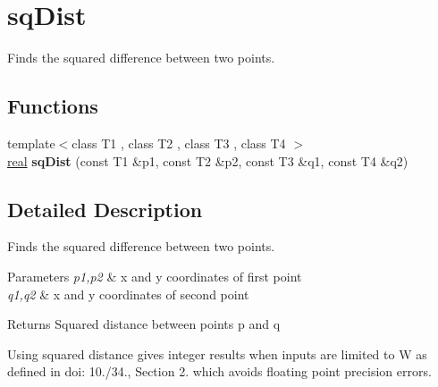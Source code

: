 \hypertarget{group__sqDist}{}\section{sq\+Dist}
\label{group__sqDist}


Finds the squared difference between two points.  


\subsection*{Functions}
\begin{DoxyCompactItemize}
\item 
\mbox{\label{group__sqDist_ga1825deef099379c7bf2f3f628b6a2079}} 
{\footnotesize template$<$class T1 , class T2 , class T3 , class T4 $>$ }\\\mbox{\hyperlink{typedefs_8h_a58a0c7cf2501f4492da833421be92547}{real}} {\bfseries sq\+Dist} (const T1 \&p1, const T2 \&p2, const T3 \&q1, const T4 \&q2)
\end{DoxyCompactItemize}


\subsection{Detailed Description}
Finds the squared difference between two points. 


\begin{DoxyParams}{Parameters}
{\em p1,p2} & x and y coordinates of first point \\
\hline
{\em q1,q2} & x and y coordinates of second point \\
\hline
\end{DoxyParams}
\begin{DoxyReturn}{Returns}
Squared distance between points p and q
\end{DoxyReturn}
Using squared distance gives integer results when inputs are limited to W as defined in doi\+: 10./34., Section 2. which avoids floating point precision errors. 